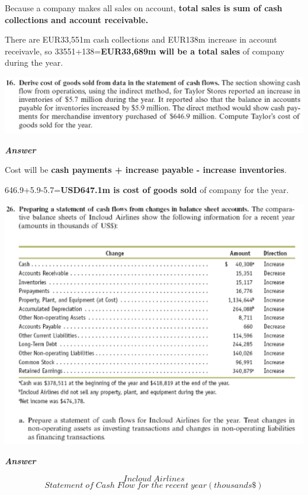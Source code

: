 \documentclass[
  a4paper,
  DIV=11,
  numbers=noendperiod]{scrreprt}
\begin{document}
Because a company makes all sales on account, \textbf{total sales is sum
of cash collections and account receivable.}

There are EUR33,551m cash collections and EUR138m increase in account
receivavle, so 33551+138=\textbf{EUR33,689m will be a total sales} of
company during the year.

\includegraphics{images/재무회계_6-16.png}

\textbf{\emph{Answer}}

Cost will be \textbf{cash payments + increase payable - increase
inventories}.

646.9+5.9-5.7=\textbf{USD647.1m is cost of goods sold} of company for
the year.

\includegraphics{images/재무회계_6-26.png}

\textbf{\emph{Answer}}

\[Incloud\;Airlines\]
\[Statement\;of\;Cash\;Flow\;for\;the\;recent\;year(thousands\$)\]
\end{document}
